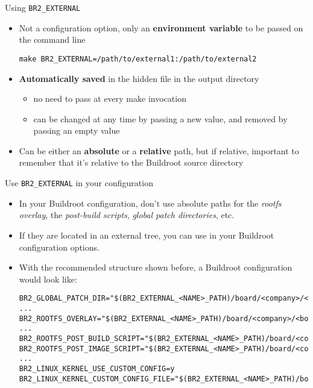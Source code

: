 \begin{frame}[fragile]{Using {\tt BR2\_EXTERNAL}}
  \begin{itemize}
  \item Not a configuration option, only an {\bf environment variable}
    to be passed on the command line
    \begin{block}{}
\begin{verbatim}
make BR2_EXTERNAL=/path/to/external1:/path/to/external2
\end{verbatim}
    \end{block}
  \item {\bf Automatically saved} in the hidden 
    file in the output directory
    \begin{itemize}
    \item no need to pass  at every make invocation
    \item can be changed at any time by passing a new value, and
      removed by passing an empty value
    \end{itemize}
  \item Can be either an {\bf absolute} or a {\bf relative} path, but
    if relative, important to remember that it's relative to the
    Buildroot source directory
  \end{itemize}
\end{frame}

\begin{frame}[fragile]{Use {\tt BR2\_EXTERNAL} in your configuration}

  \begin{itemize}
  \item In your Buildroot configuration, don't use absolute paths for
    the {\em rootfs overlay}, the {\em post-build scripts}, {\em
      global patch directories}, etc.
  \item If they are located in an external tree, you can use
     in your Buildroot configuration
    options.
  \item With the recommended structure shown before, a Buildroot
    configuration would look like:
    \begin{block}{}
{\tiny
\begin{verbatim}
BR2_GLOBAL_PATCH_DIR="$(BR2_EXTERNAL_<NAME>_PATH)/board/<company>/<boardname>/patches/"
...
BR2_ROOTFS_OVERLAY="$(BR2_EXTERNAL_<NAME>_PATH)/board/<company>/<boardname>/rootfs_overlay/"
...
BR2_ROOTFS_POST_BUILD_SCRIPT="$(BR2_EXTERNAL_<NAME>_PATH)/board/<company>/<boardname>/post_build.sh"
BR2_ROOTFS_POST_IMAGE_SCRIPT="$(BR2_EXTERNAL_<NAME>_PATH)/board/<company>/<boardname>/post_image.sh"
...
BR2_LINUX_KERNEL_USE_CUSTOM_CONFIG=y
BR2_LINUX_KERNEL_CUSTOM_CONFIG_FILE="$(BR2_EXTERNAL_<NAME>_PATH)/board/<company>/<boardname>/linux.config"
\end{verbatim}
}
    \end{block}
  \end{itemize}

\end{frame}

